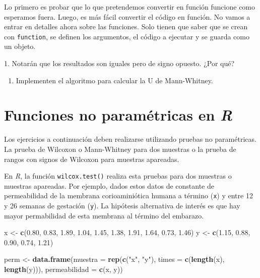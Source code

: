 \documentclass[]{book}
\newenvironment{Shaded}{\begin{snugshade}}{\end{snugshade}}
\newcommand{\DataTypeTok}[1]{\textcolor[rgb]{0.13,0.29,0.53}{#1}}
\newcommand{\FloatTok}[1]{\textcolor[rgb]{0.00,0.00,0.81}{#1}}
\newcommand{\KeywordTok}[1]{\textcolor[rgb]{0.13,0.29,0.53}{\textbf{#1}}}
\newcommand{\NormalTok}[1]{#1}
\newcommand{\StringTok}[1]{\textcolor[rgb]{0.31,0.60,0.02}{#1}}
\providecommand{\tightlist}{%
  \setlength{\itemsep}{0pt}\setlength{\parskip}{0pt}}
\theoremstyle{definition}
\theoremstyle{definition}
\theoremstyle{definition}
\theoremstyle{remark}
\let\BeginKnitrBlock\begin \let\EndKnitrBlock\end
\begin{document}
Lo primero es probar que lo que pretendemos convertir en función
funcione como esperamos fuera. Luego, es más fácil convertir el código
en función. No vamos a entrar en detalles ahora sobre las funciones.
Solo tienen que saber que se crean con \texttt{function}, se definen los
argumentos, el código a ejecutar y se guarda como un objeto.

\BeginKnitrBlock{exercise}
\protect\hypertarget{exr:unnamed-chunk-8}{}{\label{exr:unnamed-chunk-8} }1.
Notarán que los resultados son iguales pero de signo opuesto. ¿Por qué?

\begin{enumerate}
\def\labelenumi{\arabic{enumi}.}
\setcounter{enumi}{1}
\tightlist
\item
  Implementen el algoritmo para calcular la U de Mann-Whitney.
\end{enumerate}
\EndKnitrBlock{exercise}

\hypertarget{funciones-no-parametricas-en-r}{%
\section{\texorpdfstring{Funciones no paramétricas en
\emph{R}}{Funciones no paramétricas en R}}\label{funciones-no-parametricas-en-r}}

Los ejercicios a continuación deben realizarse utilizando pruebas no
paramétricas. La prueba de Wilcoxon o Mann-Whitney para dos muestras o
la prueba de rangos con signos de Wilcoxon para muestras apareadas.

En \emph{R}, la función \texttt{wilcox.test()} realiza esta pruebas para
dos muestras o muestras apareadas. Por ejemplo, dados estos datos de
constante de permeabilidad de la membrana corioaminiótica humana a
término (\texttt{x}) y entre 12 y 26 semanas de gestación (\texttt{y}).
La hipótesis alternativa de interés es que hay mayor permabilidad de
esta membrana al término del embarazo.

\begin{Shaded}
\begin{Highlighting}[]
\NormalTok{x <-}\StringTok{ }\KeywordTok{c}\NormalTok{(}\FloatTok{0.80}\NormalTok{, }\FloatTok{0.83}\NormalTok{, }\FloatTok{1.89}\NormalTok{, }\FloatTok{1.04}\NormalTok{, }\FloatTok{1.45}\NormalTok{, }\FloatTok{1.38}\NormalTok{, }\FloatTok{1.91}\NormalTok{, }\FloatTok{1.64}\NormalTok{, }\FloatTok{0.73}\NormalTok{, }\FloatTok{1.46}\NormalTok{)}
\NormalTok{y <-}\StringTok{ }\KeywordTok{c}\NormalTok{(}\FloatTok{1.15}\NormalTok{, }\FloatTok{0.88}\NormalTok{, }\FloatTok{0.90}\NormalTok{, }\FloatTok{0.74}\NormalTok{, }\FloatTok{1.21}\NormalTok{)}

\NormalTok{perm <-}\StringTok{ }\KeywordTok{data.frame}\NormalTok{(}\DataTypeTok{muestra =} \KeywordTok{rep}\NormalTok{(}\KeywordTok{c}\NormalTok{(}\StringTok{"x"}\NormalTok{, }\StringTok{"y"}\NormalTok{), }\DataTypeTok{times =} \KeywordTok{c}\NormalTok{(}\KeywordTok{length}\NormalTok{(x), }\KeywordTok{length}\NormalTok{(y))),}
           \DataTypeTok{permeabilidad =} \KeywordTok{c}\NormalTok{(x, y))}
\end{Highlighting}
\end{Shaded}
\end{document}
